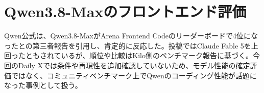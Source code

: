 \section{Qwen3.8-Maxのフロントエンド評価}
Qwen公式は、Qwen3.8-MaxがArena Frontend Codeのリーダーボードで4位になったとの第三者報告を引用し、肯定的に反応した。投稿ではClaude Fable 5を上回ったともされているが、順位や比較はKilo側のベンチマーク報告に基づく。今回のDaily Xでは条件や再現性を追加確認していないため、モデル性能の確定評価ではなく、コミュニティベンチマーク上でQwenのコーディング性能が話題になった事例として扱う。
